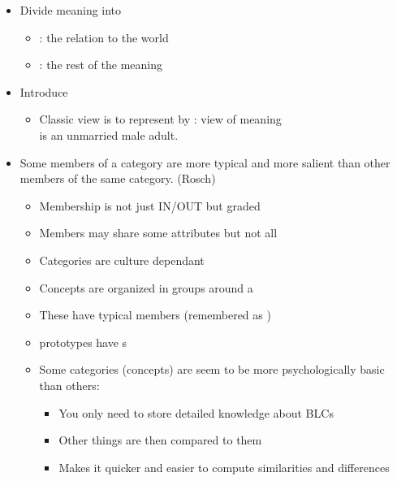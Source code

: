 \documentclass[headrule,footrule]{foils}
\begin{document}
\begin{itemize}
\item Divide meaning into
  \begin{itemize}
  \item {}: the relation to the world
  \item {}: the rest of the meaning
  \end{itemize}
\item Introduce 
  \begin{itemize}
  \item Classic view is to represent by :  view of meaning
    \\  is an unmarried male adult.
\end{itemize}
\end{itemize}



\begin{itemize}
\item Some members of a category are more typical and more 
  salient than other members of the same category. (Rosch)
  \begin{itemize}
  \item Membership is not just IN/OUT but graded
  \item Members may share some attributes but not all
  \item Categories are culture dependant
 \item Concepts are organized in groups around a 
    \item These have typical members (remembered as ) 
\item prototypes have s
\item Some categories (concepts) are seem to be more psychologically basic than others: 
  \begin{itemize}
  \item You only need to store detailed knowledge about BLCs
  \item Other things are then compared to them
  \item Makes it quicker and easier to compute similarities and differences
  \end{itemize}
  \end{itemize}
\end{itemize}

\end{document}
